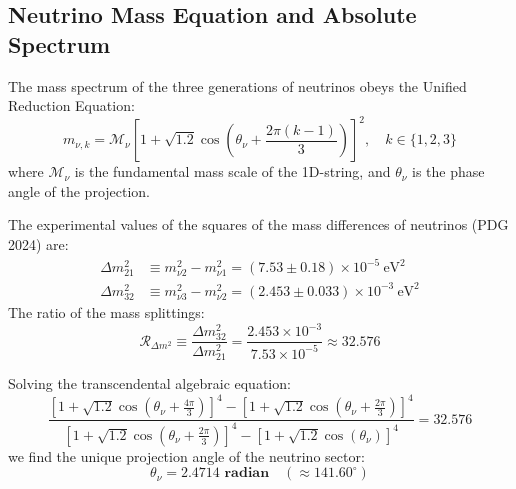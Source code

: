 \documentclass[12pt,a4paper]{article}
\begin{document}
		\subsection{Neutrino Mass Equation and Absolute Spectrum}
		The mass spectrum of the three generations of neutrinos obeys the Unified Reduction Equation:
		\begin{equation}
			m_{\nu, k} = \mathcal{M}_\nu \left[ 1 + \sqrt{1.2} \cos\left( \theta_\nu + \frac{2\pi(k-1)}{3} \right) \right]^2, \quad k \in \{1, 2, 3\}
		\end{equation}
		where $\mathcal{M}_\nu$ is the fundamental mass scale of the 1D-string, and $\theta_\nu$ is the phase angle of the projection.
		
		The experimental values of the squares of the mass differences of neutrinos (PDG 2024) are:
		\begin{align}
			\Delta m_{21}^2 &\equiv m_{\nu 2}^2 - m_{\nu 1}^2 = (7.53 \pm 0.18) \times 10^{-5} \ \text{eV}^2 \\
			\Delta m_{32}^2 &\equiv m_{\nu 3}^2 - m_{\nu 2}^2 = (2.453 \pm 0.033) \times 10^{-3} \ \text{eV}^2
		\end{align}
		The ratio of the mass splittings:
		\begin{equation}
			\mathcal{R}_{\Delta m^2} \equiv \frac{\Delta m_{32}^2}{\Delta m_{21}^2} = \frac{2.453 \times 10^{-3}}{7.53 \times 10^{-5}} \approx \mathbf{32.576}
		\end{equation}
		
		Solving the transcendental algebraic equation:
		\begin{equation}
			\frac{\left[ 1 + \sqrt{1.2} \cos\left(\theta_\nu + \frac{4\pi}{3}\right) \right]^4 - \left[ 1 + \sqrt{1.2} \cos\left(\theta_\nu + \frac{2\pi}{3}\right) \right]^4}{\left[ 1 + \sqrt{1.2} \cos\left(\theta_\nu + \frac{2\pi}{3}\right) \right]^4 - \left[ 1 + \sqrt{1.2} \cos(\theta_\nu) \right]^4} = 32.576
		\end{equation}
		we find the unique projection angle of the neutrino sector:
		\begin{equation}
			\theta_\nu = \mathbf{2.4714 \text{ radian}} \quad (\approx 141.60^{\circ})
		\end{equation}
		
\end{document}
